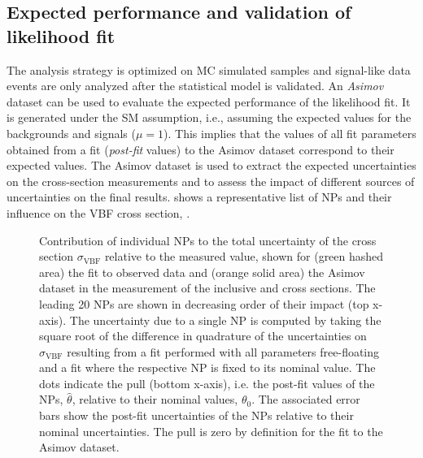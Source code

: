 \subsection{Expected performance and validation of likelihood fit}
\label{subsec:expected-performannce}
The analysis strategy is optimized on MC simulated samples and signal-like data events are only analyzed after the statistical model is validated.
An \emph{Asimov} dataset can be used to evaluate the expected performance of the likelihood fit. It is generated under the SM assumption, i.e., assuming the expected values for the backgrounds and signals ($\mu=1$). 
This implies that the values of all fit parameters obtained from a fit (\emph{post-fit} values) to the Asimov dataset correspond to their expected values. 
The Asimov dataset is used to extract the expected uncertainties on the cross-section measurements and to assess the impact of different sources of uncertainties on the final results. 
 shows a representative list of NPs and their influence on the VBF cross section, \sigmaVBF. 
\begin{figure}[th]
    \centering
    {\caption{Contribution of individual NPs to the total uncertainty of the cross section $\sigma_{\mathrm{VBF}}$ relative to the measured value, shown for (green hashed area) the fit to observed data and (orange solid area) the Asimov dataset in the measurement of the inclusive \muVBF and \muGGF cross sections. The leading 20 NPs are shown in decreasing order of their impact (top x-axis).
    The uncertainty due to a single NP is computed by taking the square root of the difference in quadrature of the uncertainties on $\sigma_{\mathrm{VBF}}$ resulting from a fit performed with all parameters free-floating and a fit where the respective NP is fixed to its nominal value. 
    The dots indicate the pull (bottom x-axis), i.e. the post-fit values of the NPs, $\hat{\theta}$, relative to their nominal values, $\theta_0$. 
    The associated error bars show the post-fit uncertainties of the NPs relative to their nominal uncertainties. 
    The pull is zero by definition for the fit to the Asimov dataset.
    \label{fig:fit:breakdown} }}
\end{figure}
